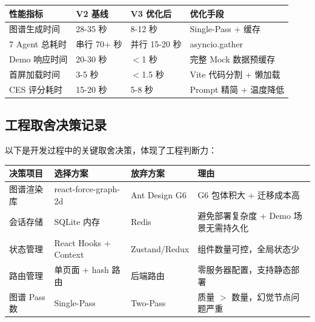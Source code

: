 \documentclass[12pt,a4paper]{ctexart}
\begin{document}
\begin{center}
\begin{tabular}{p{4cm} p{3cm} p{3cm} p{4cm}}
\toprule
\textbf{性能指标} & \textbf{V2 基线} & \textbf{V3 优化后} & \textbf{优化手段} \\
\midrule
图谱生成时间 & 28-35 秒 & 8-12 秒 & Single-Pass + 缓存 \\[2pt]
7 Agent 总耗时 & 串行 70+ 秒 & 并行 15-20 秒 & asyncio.gather \\[2pt]
Demo 响应时间 & 20-30 秒 & $<$1 秒 & 完整 Mock 数据预缓存 \\[2pt]
首屏加载时间 & 3-5 秒 & $<$1.5 秒 & Vite 代码分割 + 懒加载 \\[2pt]
CES 评分耗时 & 15-20 秒 & 5-8 秒 & Prompt 精简 + 温度降低 \\
\bottomrule
\end{tabular}
\end{center}

\subsection{工程取舍决策记录}

以下是开发过程中的关键取舍决策，体现了工程判断力：

\begin{center}
{\small
\begin{tabular}{p{3cm} p{3.5cm} p{3.5cm} p{4cm}}
\toprule
\textbf{决策项目} & \textbf{选择方案} & \textbf{放弃方案} & \textbf{理由} \\
\midrule
图谱渲染库 & react-force-graph-2d & Ant Design G6 & G6 包体积大 + 迁移成本高 \\[2pt]
会话存储 & SQLite 内存 & Redis & 避免部署复杂度 + Demo 场景无需持久化 \\[2pt]
状态管理 & React Hooks + Context & Zustand/Redux & 组件数量可控，全局状态少 \\[2pt]
路由管理 & 单页面 + hash 路由 & 后端路由 & 零服务器配置，支持静态部署 \\[2pt]
图谱 Pass 数 & Single-Pass & Two-Pass & 质量 $>$ 数量，幻觉节点问题严重 \\
\bottomrule
\end{tabular}
}
\end{center}


\newpage
\begin{center}
\end{center}
\end{document}
